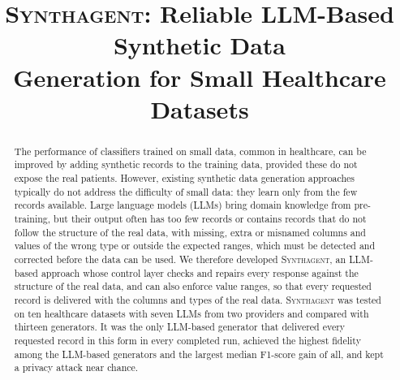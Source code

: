 \documentclass[conference]{IEEEtran}
\newcommand{\system}{\textsc{Synthagent}\xspace}
\begin{document}
\title{\system: Reliable LLM-Based Synthetic Data\\Generation for Small Healthcare Datasets}

\author{%
}

\maketitle

\begin{abstract}
The performance of classifiers trained on small data, common in healthcare, can be improved by adding synthetic records to the training data, provided these do not expose the real patients. However, existing synthetic data generation approaches typically do not address the difficulty of small data: they learn only from the few records available. Large language models (LLMs) bring domain knowledge from pre-training, but their output often has too few records or contains records that do not follow the structure of the real data, with missing, extra or misnamed columns and values of the wrong type or outside the expected ranges, which must be detected and corrected before the data can be used. We therefore developed \system, an LLM-based approach whose control layer checks and repairs every response against the structure of the real data, and can also enforce value ranges, so that every requested record is delivered with the columns and types of the real data. \system was tested on ten healthcare datasets with seven LLMs from two providers and compared with thirteen generators. It was the only LLM-based generator that delivered every requested record in this form in every completed run, achieved the highest fidelity among the LLM-based generators and the largest median F1-score gain of all, and kept a privacy attack near chance.
\end{abstract}
\end{document}
